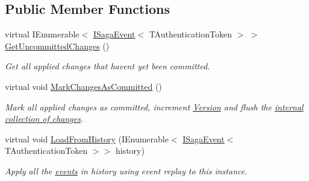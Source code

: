 \subsection*{Public Member Functions}
\begin{DoxyCompactItemize}
\item 
virtual I\+Enumerable$<$ \hyperlink{interfaceCqrs_1_1Events_1_1ISagaEvent}{I\+Saga\+Event}$<$ T\+Authentication\+Token $>$ $>$ \hyperlink{classCqrs_1_1Domain_1_1Saga_a759b30b518c7fa5037ec4041054f349c_a759b30b518c7fa5037ec4041054f349c}{Get\+Uncommitted\+Changes} ()
\begin{DoxyCompactList}\small\item\em Get all applied changes that haven\textquotesingle{}t yet been committed. \end{DoxyCompactList}\item 
virtual void \hyperlink{classCqrs_1_1Domain_1_1Saga_a9caac842ea6e88d6e502b63ca1820fe4_a9caac842ea6e88d6e502b63ca1820fe4}{Mark\+Changes\+As\+Committed} ()
\begin{DoxyCompactList}\small\item\em Mark all applied changes as committed, increment \hyperlink{classCqrs_1_1Domain_1_1Saga_a581e88da4e3e76d3704586f97866a7a6_a581e88da4e3e76d3704586f97866a7a6}{Version} and flush the \hyperlink{}{internal collection of changes}. \end{DoxyCompactList}\item 
virtual void \hyperlink{classCqrs_1_1Domain_1_1Saga_a6029fc09445e2093f7fb40e304a04ff8_a6029fc09445e2093f7fb40e304a04ff8}{Load\+From\+History} (I\+Enumerable$<$ \hyperlink{interfaceCqrs_1_1Events_1_1ISagaEvent}{I\+Saga\+Event}$<$ T\+Authentication\+Token $>$$>$ history)
\begin{DoxyCompactList}\small\item\em Apply all the \hyperlink{}{events} in {\itshape history}  using event replay to this instance. \end{DoxyCompactList}\end{DoxyCompactItemize}
